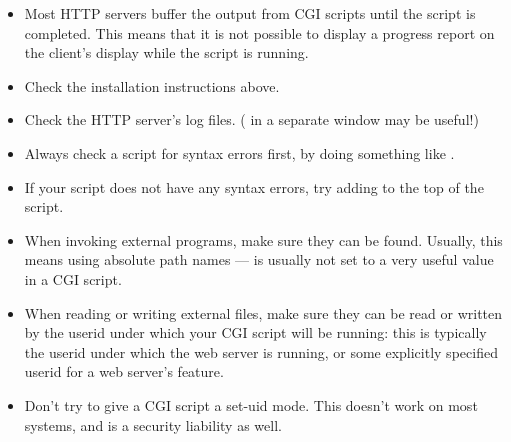 \begin{itemize}
\item Most HTTP servers buffer the output from CGI scripts until the
script is completed.  This means that it is not possible to display a
progress report on the client's display while the script is running.

\item Check the installation instructions above.

\item Check the HTTP server's log files.  ( in a
separate window may be useful!)

\item Always check a script for syntax errors first, by doing something
like .

\item If your script does not have any syntax errors, try adding
 to the top of the script.

\item When invoking external programs, make sure they can be found.
Usually, this means using absolute path names ---  is
usually not set to a very useful value in a CGI script.

\item When reading or writing external files, make sure they can be read
or written by the userid under which your CGI script will be running:
this is typically the userid under which the web server is running, or some
explicitly specified userid for a web server's  feature.

\item Don't try to give a CGI script a set-uid mode.  This doesn't work on
most systems, and is a security liability as well.
\end{itemize}

